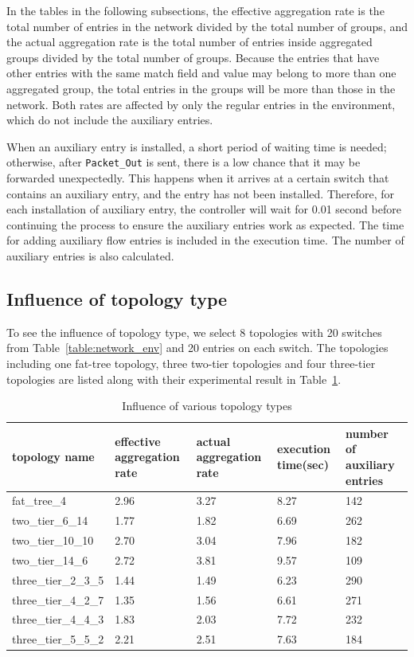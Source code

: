 In the tables in the following subsections, the effective aggregation rate is the total number of entries in the network divided by the total number of groups, and the actual aggregation rate is the total number of entries inside aggregated groups divided by the total number of groups. Because the entries that have other entries with the same match field and value may belong to more than one aggregated group, the total entries in the groups will be more than those in the network. Both rates are affected by only the regular entries in the environment, which do not include the auxiliary entries.

When an auxiliary entry is installed, a short period of waiting time is needed; otherwise, after \texttt{Packet\_Out} is sent, there is a low chance that it may be forwarded unexpectedly. This happens when it arrives at a certain switch that contains an auxiliary entry, and the entry has not been installed. Therefore, for each installation of auxiliary entry, the controller will wait for 0.01 second before continuing the process to ensure the auxiliary entries work as expected. The time for adding auxiliary flow entries is included in the execution time. The number of auxiliary entries is also calculated.

\subsection{Influence of topology type}
To see the influence of topology type, we select 8 topologies with 20 switches from Table~\ref{table:network_env} and 20 entries on each switch. The topologies including one fat-tree topology, three two-tier topologies and four three-tier topologies are listed along with their experimental result in Table~\ref{table:different_topo_type}. 

\begin{table}
\centering
\caption{Influence of various topology types}
\begin{tabular}{|l|p{2.5cm}|p{2.5cm}|p{1.9cm}|p{2.8cm}|}
\hline topology name & effective aggregation rate & actual aggregation rate & execution time(sec) & number of auxiliary entries \\
\hline
\hline fat\_tree\_4 & 2.96 & 3.27 & 8.27 & 142 \\
\hline two\_tier\_6\_14 & 1.77 & 1.82 & 6.69 & 262 \\ 
\hline two\_tier\_10\_10 & 2.70 & 3.04 & 7.96 & 182 \\
\hline two\_tier\_14\_6 & 2.72 & 3.81 & 9.57 & 109 \\ 
\hline three\_tier\_2\_3\_5 & 1.44 & 1.49 & 6.23 & 290 \\
\hline three\_tier\_4\_2\_7 & 1.35 & 1.56 & 6.61 & 271 \\
\hline three\_tier\_4\_4\_3 & 1.83 & 2.03 & 7.72 & 232 \\
\hline three\_tier\_5\_5\_2 & 2.21 & 2.51 & 7.63 & 184 \\
\hline
\end{tabular}
\label{table:different_topo_type}
\end{table}

